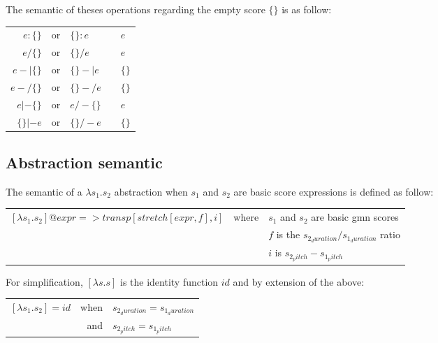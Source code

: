\documentclass[10pt,a4paper,frenchb]{article}
\makeatletter
\newcommand{\es}			{\{\}}
\newcommand{\applyop}	{\ensuremath{@}}
\newcommand{\seq}			{:}
\makeatother
\begin{document}
The semantic of theses operations regarding the empty score $\es$ is as follow:
\begin{center}
\begin{tabular}{rclc@{$\rightarrow$\ }l}
 $e \seq \es$ & or & $\es \seq e$ &  & $e$  \\
 $e / \es$ & or & $\es / e$ &  & $e$  \\
 $e -| \es$ & or & $\es -| e$ &  & $\es$  \\
 $e -/ \es$ & or & $\es -/ e$ &  & $\es$  \\
 $e |- \es$ & or & $e /- \es$ &  & $e$  \\
 $\es |- e$ & or & $\es /- e$ &  & $\es$  \\
\end{tabular}
\end{center}


\subsection{Abstraction semantic}

The semantic of a $\lambda s_1.s_2$ abstraction when $s_1$ and $s_2$ are basic score expressions is defined as follow:

\begin{center}
\begin{tabular}{rcl}
 $[\lambda s_1.s_2] \applyop expr => transp[stretch[expr, f], i]$ & where & $s_1$ and $s_2$ are basic gmn scores \\
 	& & $f$ is the $s_{2_duration} / s_{1_duration}$ ratio \\
 	& & $i$ is $s_{2_pitch} - s_{1_pitch}$ \\
\end{tabular}
\end{center}

For simplification, $[\lambda s.s]$ is the identity function $id$ and by extension of the above:
\vspace{-6mm}\\ 
\begin{center}
\begin{tabular}{rrl}
 $[\lambda s_1.s_2] = id$ & when & $s_{2_duration} = s_{1_duration}$ \\
 	& and & $s_{2_pitch} = s_{1_pitch}$ \\
\end{tabular}
\end{center}
\end{document}
